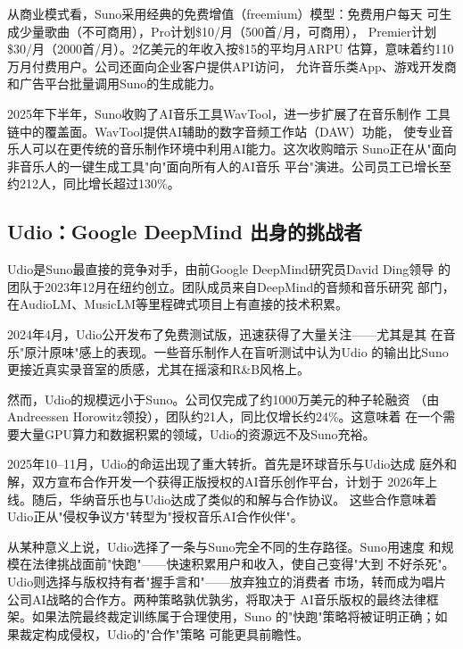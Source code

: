 从商业模式看，Suno采用经典的免费增值（freemium）模型：免费用户每天
可生成少量歌曲（不可商用），Pro计划\$10/月（500首/月，可商用），
Premier计划\$30/月（2000首/月）。2亿美元的年收入按\$15的平均月ARPU
估算，意味着约110万月付费用户。公司还面向企业客户提供API访问，
允许音乐类App、游戏开发商和广告平台批量调用Suno的生成能力。

2025年下半年，Suno收购了AI音乐工具WavTool，进一步扩展了在音乐制作
工具链中的覆盖面。WavTool提供AI辅助的数字音频工作站（DAW）功能，
使专业音乐人可以在更传统的音乐制作环境中利用AI能力。这次收购暗示
Suno正在从"面向非音乐人的一键生成工具"向"面向所有人的AI音乐
平台"演进。公司员工已增长至约212人，同比增长超过130\%。

\subsection{Udio：Google DeepMind 出身的挑战者}
\label{subsec:udio}

Udio是Suno最直接的竞争对手，由前Google DeepMind研究员David Ding领导
的团队于2023年12月在纽约创立。团队成员来自DeepMind的音频和音乐研究
部门，在AudioLM、MusicLM等里程碑式项目上有直接的技术积累。

2024年4月，Udio公开发布了免费测试版，迅速获得了大量关注——尤其是其
在音乐"原汁原味"感上的表现。一些音乐制作人在盲听测试中认为Udio
的输出比Suno更接近真实录音室的质感，尤其在摇滚和R\&B风格上。

然而，Udio的规模远小于Suno。公司仅完成了约1000万美元的种子轮融资
（由Andreessen Horowitz领投），团队约21人，同比仅增长约24\%。这意味着
在一个需要大量GPU算力和数据积累的领域，Udio的资源远不及Suno充裕。

2025年10--11月，Udio的命运出现了重大转折。首先是环球音乐与Udio达成
庭外和解，双方宣布合作开发一个获得正版授权的AI音乐创作平台，计划于
2026年上线。随后，华纳音乐也与Udio达成了类似的和解与合作协议。
这些合作意味着Udio正从"侵权争议方"转型为"授权音乐AI合作伙伴"。

从某种意义上说，Udio选择了一条与Suno完全不同的生存路径。Suno用速度
和规模在法律挑战面前"快跑"——快速积累用户和收入，使自己变得"大到
不好杀死"。Udio则选择与版权持有者"握手言和"——放弃独立的消费者
市场，转而成为唱片公司AI战略的合作方。两种策略孰优孰劣，将取决于
AI音乐版权的最终法律框架。如果法院最终裁定训练属于合理使用，Suno
的"快跑"策略将被证明正确；如果裁定构成侵权，Udio的"合作"策略
可能更具前瞻性。

